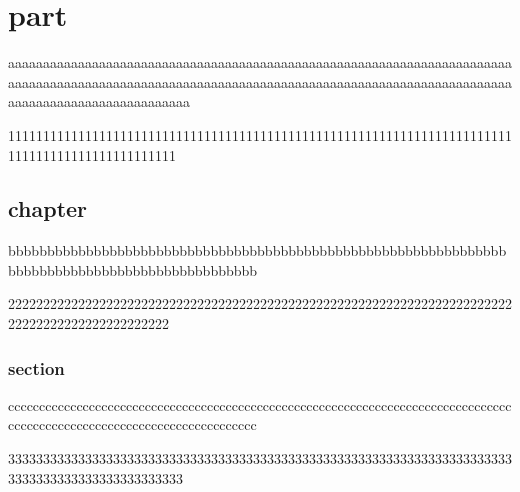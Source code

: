 \documentclass{jreport}
\begin{document}
\part{part}
aaaaaaaaaaaaaaaaaaaaaaaaaaaaaaaaaaaaaaaaaaaaaaaaaaaaaaaaaaaaaaaaaaaaaaaaaaaaaaaaaaaaaaaaaaaaaaaaaaaaaaaaaaaaaaaaaaaaaaaaaaaaaaaaaaaaaaaaaaaaaaaaaaaaaaaaaaaaaaaaaaaaaaaaaa

111111111111111111111111111111111111111111111111111111111111111111111111111111111111111111111111


\chapter{chapter}
bbbbbbbbbbbbbbbbbbbbbbbbbbbbbbbbbbbbbbbbbbbbbbbbbbbbbbbbbbbbbbbbbbbbbbbbbbbbbbbbbbbbbbbbbbbbbbbb

22222222222222222222222222222222222222222222222222222222222222222222222222222222222222222222222

\section{section}

ccccccccccccccccccccccccccccccccccccccccccccccccccccccccccccccccccccccccccccccccccccccccccccccccccccccccccccccccccccccccc

3333333333333333333333333333333333333333333333333333333333333333333333333333333333333333333333333
\end{document}
